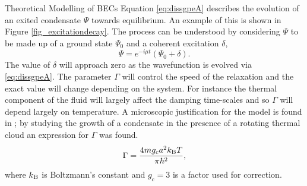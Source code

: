 \begin{chapter}{\label{cha:theoretical_model}Theoretical Modelling of BECs}
	Equation \ref{eq:dissgpeA} describes the evolution of an exited condensate $\Psi$ towards equilibrium. An example of this is shown in Figure \ref{fig_excitationdecay}. The process can be understood by considering $\Psi$ to be made up of a ground state $\Psi_0$ and a coherent excitation $\delta$,
	\begin{equation*}\label{eq:dissantiherm2}
		\Psi = e^{-i \mu t}(\Psi_0 + \delta).
	\end{equation*}
	The value of $\delta$ will approach zero as the wavefunction is evolved via \ref{eq:dissgpeA}. The parameter $\Gamma$ will control the speed of the relaxation and the exact value will change depending on the system. For instance the thermal component of the fluid will largely affect the damping time-scales and so $\Gamma$ will depend largely on temperature. A microscopic justification for the model is found in \cite{penckwitt_2002, gardiner97}; by studying the growth of a condensate in the presence of a rotating thermal cloud an expression for $\Gamma$ was found.
		\begin{equation}\label{eq:dissgamma}
		\Gamma = \frac{4mg_ca^2k_{\rm B}T}{\pi\hbar^2},
		\end{equation}
	where $k_{\rm B}$ is Boltzmann's constant and $g_c = 3$ is a factor used for correction.
\begin{figure}[!ht]
	\centering
  \hspace{-0.039\linewidth}
  \begin{tikzpicture}

\end{tikzpicture}
\end{figure}
\end{chapter}
